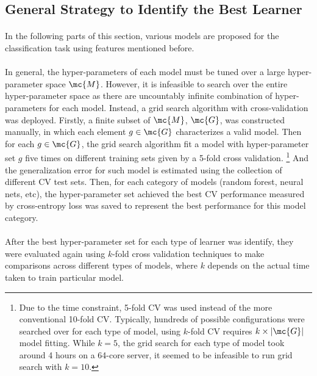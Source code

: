 \documentclass[11pt]{article}
\begin{document}
	\subsection{General Strategy to Identify the Best Learner}
	\paragraph{} In the following parts of this section, various models are proposed for the classification task using features mentioned before.
	\paragraph{} In general, the hyper-parameters of each model must be tuned over a large hyper-parameter space $\mc{M}$. However, it is infeasible to search over the entire hyper-parameter space as there are uncountably infinite combination of hyper-parameters for each model. Instead, a grid search algorithm with cross-validation was deployed. Firstly, a finite subset of $\mc{M}$, $\mc{G}$, was constructed manually, in which each element $g \in \mc{G}$ characterizes a valid model. Then for each $g \in \mc{G}$, the grid search algorithm fit a model with hyper-parameter set $g$ five times on different training sets given by a 5-fold cross validation.
	\footnote{Due to the time constraint, 5-fold CV was used instead of the more conventional 10-fold CV. Typically, hundreds of possible configurations were searched over for each type of model, using $k$-fold CV requires $k \times |\mc{G}|$ model fitting. While $k=5$, the grid search for each type of model took around 4 hours on a 64-core server, it seemed to be infeasible to run grid search with $k=10$.}
	And the generalization error for such model is estimated using the collection of different CV test sets. Then, for each category of models (random forest, neural nets, etc), the hyper-parameter set  achieved the best CV performance measured by cross-entropy loss was saved to represent the best performance for this model category.
	
	 \paragraph{} After the best hyper-parameter set for each type of learner was identify, they were evaluated again using $k$-fold cross validation techniques to make comparisons across different types of models, where $k$ depends on the actual time taken to train particular model.
	
\end{document}
